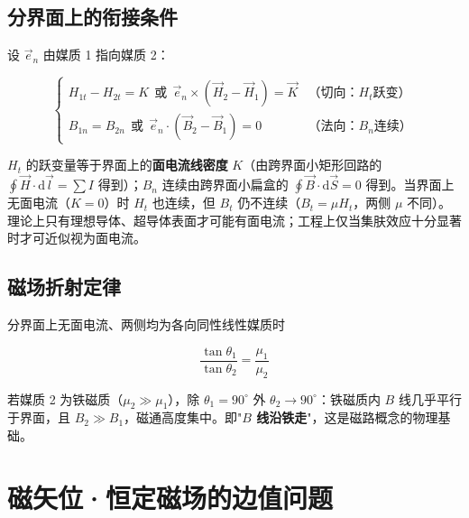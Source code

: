 \subsection{分界面上的衔接条件}
设 $\vec{e}_n$ 由媒质 1 指向媒质 2：
\begin{formulaBox}
\[
\begin{cases}
H_{1t}-H_{2t}=K\ \ \text{或}\ \ \vec{e}_n\times(\vec{H}_2-\vec{H}_1)=\vec{K} & \text{（切向：}H_t\text{跃变）}\\[4pt]
B_{1n}=B_{2n}\ \ \text{或}\ \ \vec{e}_n\cdot(\vec{B}_2-\vec{B}_1)=0 & \text{（法向：}B_n\text{连续）}
\end{cases}
\]
\end{formulaBox}
$H_t$ 的跃变量等于界面上的\textbf{面电流线密度} $K$（由跨界面小矩形回路的 $\oint\vec{H}\cdot\mathrm{d}\vec{l}=\sum I$ 得到）；$B_n$ 连续由跨界面小扁盒的 $\oint\vec{B}\cdot\mathrm{d}\vec{S}=0$ 得到。当界面上无面电流（$K=0$）时 $H_t$ 也连续，但 $B_t$ 仍不连续（$B_t=\mu H_t$，两侧 $\mu$ 不同）。理论上只有理想导体、超导体表面才可能有面电流；工程上仅当集肤效应十分显著时才可近似视为面电流。

\subsection{磁场折射定律}
分界面上无面电流、两侧均为各向同性线性媒质时
\begin{formulaBox}
\[
\frac{\tan\theta_1}{\tan\theta_2}=\frac{\mu_1}{\mu_2}
\]
\end{formulaBox}
若媒质 2 为铁磁质（$\mu_2\gg\mu_1$），除 $\theta_1=90^\circ$ 外 $\theta_2\to90^\circ$：铁磁质内 $B$ 线几乎平行于界面，且 $B_2\gg B_1$，磁通高度集中。即"\textbf{$B$ 线沿铁走}"，这是磁路概念的物理基础。

\section{磁矢位·恒定磁场的边值问题}

